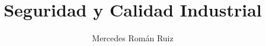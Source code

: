 \documentclass[10pt, a4paper, twoside, twocolumn]{book}
\title{Seguridad y Calidad Industrial}
\author{Mercedes Román Ruiz}
\date{}
\begin{document}
\sloppy 
\setlength{\parindent}{15pt} %
\setlength{\parskip}{5pt} %
\renewcommand\thesection{\arabic{section}}
\renewcommand{\baselinestretch}{1.5}
\renewcommand{\listtablename}{Índice de tablas} %
\renewcommand{\tablename}{Tabla} %
\renewcommand{\baselinestretch}{1.5}

\fancyhead{}
\fancyfoot{}
\pagestyle{fancy}
\chead[\rightmark]{\leftmark}

\fancyfoot[LE,RO]{\thepage}



%

%



\end{document}
